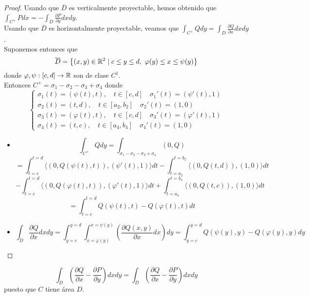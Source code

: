 \begin{proof}
        
        Usando que $\overline{D}$ es verticalmente proyectable, hemos obtenido que
        $\int_{C^+} Pdx = -\int_{D} \frac{\partial P}{\partial y}dxdy$.\\ Usando que
        $\overline{D}$ es horizontalmente proyectable, veamos que $\int_{C^+} Qdy =
            \int_{D} \frac{\partial Q}{\partial x}dxdy$.\\ Suponemos entonces que
        $$\overline{D} = \left\{ (x,y) \in \mathbb{R}^2 \mid c \leq y \leq d, \ \varphi(y) \leq x
            \leq \psi(y) \right\}$$ donde $\varphi, \psi: [c,d] \to \mathbb{R}$ son de clase
        $C^1$.\\ Entonces $C^+ = \sigma_1 - \sigma_2 - \sigma_3 + \sigma_4$ donde $$
            \begin{cases}
                \sigma_1(t) = (\psi(t), t), \quad t \in [c,d] \quad \sigma_1'(t) = (\psi'(t), 1)       \\
                \sigma_2(t) = (t, d), \quad t \in [a_2, b_2] \quad \sigma_2'(t) = (1, 0)               \\
                \sigma_3(t) = (\varphi(t), t), \quad t \in [c,d] \quad \sigma_3'(t) = (\varphi'(t), 1) \\
                \sigma_4(t) = (t, c), \quad t \in [a_4, b_4] \quad \sigma_4'(t) = (1, 0)
            \end{cases}
        $$
    
        \begin{itemize}
            \item $$\int_{C^+} Qdy = \int_{\sigma_1 - \sigma_2 - \sigma_3 + \sigma_4} (0,Q) $$
            $$= \int_{t=c}^{t=d} \langle (0,Q(\psi(t),t)), (\psi'(t),1) \rangle dt - \int_{t=a_2}^{t=b_2} \langle (0,Q(t,d)), (1,0) \rangle dt $$
            $$- \int_{t=c}^{t=d} \langle (0,Q(\varphi(t),t)), (\varphi'(t),1) \rangle dt + \int_{t=a_4}^{t=b_4} \langle (0,Q(t,c)), (1,0) \rangle dt $$
            $$= \int_{t=c}^{t=d} Q(\psi(t),t) - Q(\varphi(t),t) dt$$
            \item $$\int_{D} \frac{\partial Q}{\partial x}dxdy = \int_{y=c}^{y=d} \int_{x=\varphi(y)}^{x=\psi(y)} \left( \frac{\partial Q(x,y)}{\partial x} dx \right) dy = \int_{y=c}^{y=d} Q(\psi(y),y) - Q(\varphi(y),y) dy$$
        \end{itemize}
    
    \end{proof}
    
    \begin{observación}
    $$\int_{D} \left(\frac{\partial Q}{\partial x} - \frac{\partial P}{\partial y}\right)dxdy = \int_{\overline{D}} \left(\frac{\partial Q}{\partial x} - \frac{\partial P}{\partial y}\right)dxdy$$
    puesto que $C$ tiene área $D$.
    \end{observación}
    

